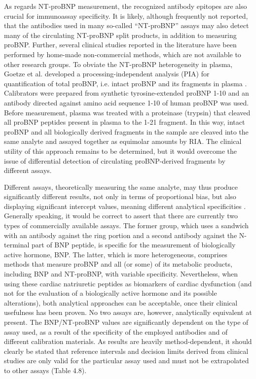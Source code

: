 \documentclass[14pt,a4paper,onecolumn]{extarticle}
\begin{document}
As regards NT-proBNP measurement, the recognized antibody epitopes are also crucial for immunoassay specificity. It is likely, although frequently not reported, that the antibodies used in many so-called “NT-proBNP” assays may also detect many of the circulating NT-proBNP split products, in addition to measuring proBNP. Further, several clinical studies reported in the literature have been performed by home-made non-commercial methods, which are not available to other research groups. To obviate the NT-proBNP heterogeneity in plasma, Goetze et al. developed a processing-independent analysis
(PIA) for quantification of total proBNP, i.e. intact proBNP and its fragments in plasma
\citep{bib285}. Calibrators were prepared from synthetic tyrosine-extended proBNP 1-10 and an
antibody directed against amino acid sequence 1-10 of human proBNP was used. Before
measurement, plasma was treated with a proteinase (trypsin) that cleaved all proBNP peptides present in plasma to the 1-21 fragment. In this way, intact proBNP and all biologically derived fragments in the sample are cleaved into the same analyte and assayed
together as equimolar amounts by RIA. The clinical utility of this approach remains to
be determined, but it would overcome the issue of differential detection of circulating
proBNP-derived fragments by different assays.

Different assays, theoretically measuring the same analyte, may thus produce significantly different results, not only in terms of proportional bias, but also displaying significant intercept values, meaning different analytical specificities \citep{bib27} \citep{bib28} \citep{bib262} \citep{bib269}. Generally speaking, it would be correct to assert that there are currently two types of commercially available assays. The former group, which uses a sandwich with an antibody
against the ring portion and a second antibody against the N-terminal part of BNP
peptide, is specific for the measurement of biologically active hormone, BNP. The latter, which is more heterogeneous, comprises methods that measure proBNP and all (or
some) of its metabolic products, including BNP and NT-proBNP, with variable specificity.
Nevertheless, when using these cardiac natriuretic peptides as biomarkers of cardiac dysfunction (and not for the evaluation of a biologically active hormone and its possible
alterations), both analytical approaches can be acceptable, once their clinical usefulness has been proven. No two assays are, however, analytically equivalent at present.
The BNP/NT-proBNP values are significantly dependent on the type of assay used, as
a result of the specificity of the employed antibodies and of different calibration materials. As results are heavily method-dependent, it should clearly be stated that reference intervals and decision limits derived from clinical studies are only valid for the
particular assay used and must not be extrapolated to other assays (Table 4.8).
\end{document}
